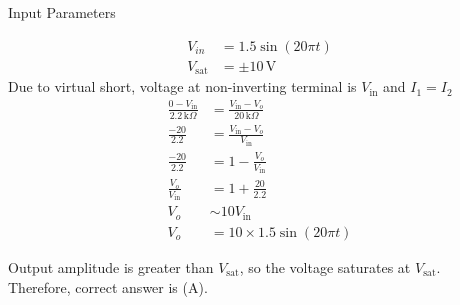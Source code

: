 \documentclass[journal,12pt,twocolumn]{IEEEtran}
\begin{document}
\begin{table}[htbp]
  \centering
  
  \caption{Input Parameters}
\end{table}
\begin{align}
V_{in} &= 1.5 \sin(20\pi t)\\
V_{\text{sat}} &= \pm 10 \, \text{V}
\end{align}
Due to virtual short, voltage at non-inverting terminal is \( V_{\text{in}} \) and $I_1 = I_2$\\
\begin{align}
\frac{0 - V_{\text{in}}}{2.2 \, \text{k}\Omega} &= \frac{V_{\text{in}} - V_o}{20 \, \text{k}\Omega}\\
\frac{-20}{2.2} &= \frac{V_{\text{in}} - V_o}{V_{\text{in}}}\\
\frac{-20}{2.2} &= 1 - \frac{V_o}{V_{\text{in}}}\\
\frac{V_o}{V_{\text{in}}} &= 1 + \frac{20}{2.2}\\
V_o &\sim 10 V_{\text{in}}\\
V_o &= 10 \times 1.5 \sin(20\pi t)
\end{align}

Output amplitude is greater than $V_{\text{sat}}$, so the voltage saturates at $V_{\text{sat}}$.\\
Therefore, correct answer is (A).
\end{document}
